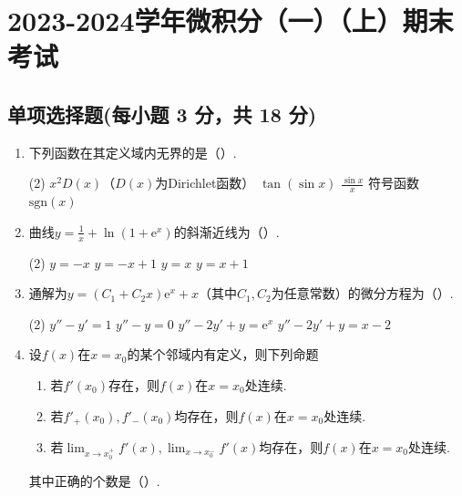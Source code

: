 \documentclass[../Main.tex]{subfiles}
\begin{document}
\chapter{2023-2024学年微积分（一）（上）期末考试}

\section{单项选择题(每小题 3 分，共 18 分)}
\begin{enumerate}
    \item 下列函数在其定义域内无界的是（\qquad）.

          \begin{tasks}[label=\textbf{\Alph*.}, label-width=1.5em, column-sep=1em](2)
              \task $x^{2}D(x)$（$D(x)$为Dirichlet函数）
              \task $\tan(\sin x)$
              \task $\frac{\sin x}{x}$
              \task 符号函数$\mathrm{sgn}(x)$
          \end{tasks}

    \item 曲线$y=\frac{1}{x}+\ln\left(1+\mathrm{e}^{x}\right)$的斜渐近线为（\qquad）.

          \begin{tasks}[label=\textbf{\Alph*.}, label-width=1.5em, column-sep=1em](2)
              \task $y=-x$
              \task $y=-x+1$
              \task $y=x$
              \task $y=x+1$
          \end{tasks}

    \item 通解为$y=(C_{1}+C_{2} x)\mathrm{e}^{x}+x$（其中$C_{1},C_{2}$为任意常数）的微分方程为（\qquad）.

          \begin{tasks}[label=\textbf{\Alph*.}, label-width=1.5em, column-sep=1em](2)
              \task $y''-y'=1$
              \task $y''-y=0$
              \task $y''-2y'+y=\mathrm{e}^{x}$
              \task $y''-2y'+y=x-2$
          \end{tasks}

    \item 设$f(x)$在$x=x_{0}$的某个邻域内有定义，则下列命题
          \begin{enumerate}
              \item 若$f'(x_{0})$存在，则$f(x)$在$x=x_{0}$处连续.

              \item 若$f'_{+}(x_{0}),f'_{-}(x_{0})$均存在，则$f(x)$在$x=x_{0}$处连续.

              \item 若$\lim_{x\to x_0^+}f'(x),\lim_{x\to x_0^-}f'(x)$均存在，则$f(x)$在$x
                        =x_{0}$处连续.
          \end{enumerate}
          其中正确的个数是（\qquad）.


\end{enumerate}
\end{document}
